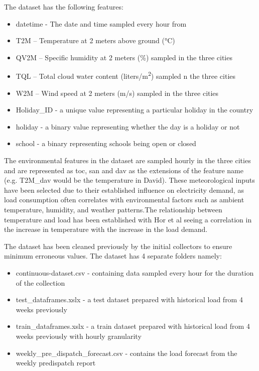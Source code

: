 The dataset has the following features:
\begin{itemize}
	\item datetime - The date and time sampled every hour from 
	\item T2M – Temperature at 2 meters above ground (°C)
	\item QV2M – Specific humidity at 2 meters (\%) sampled in the three cities
	\item TQL – Total cloud water content (liters/\si{m^2}) sampled n the three cities
	\item W2M – Wind speed at 2 meters (m/s) sampled in the three cities
	\item Holiday\_ID - a unique value representing a particular holiday in the country
	\item holiday - a binary value representing whether the day is a holiday or not
	\item school - a binary representing schools being open or closed \cite{dataset}
	
\end{itemize}


The environmental features in the dataset are sampled hourly in the three cities and are represented as toc, san and dav as the extensions of the feature name (e.g. T2M\_dav would be the temperature in David). These meteorological inputs have been selected due to their established influence on electricity demand, as load consumption often correlates with environmental factors such as ambient temperature, humidity, and weather patterns.The relationship between temperature and load has been established with Hor et al \cite{hor2005analyzing} seeing a correlation in the increase in temperature with the increase in the load demand.

The dataset has been cleaned previously by the  initial collectors to ensure minimum erroneous values. The dataset has 4 separate folders namely:
\begin{itemize}
	\item continuous-dataset.csv - containing data sampled every hour for the duration of the collection
	\item test\_dataframes.xslx - a test dataset prepared with historical load from 4 weeks previously \cite{dataset}
	\item train\_dataframes.xslx - a train dataset prepared with historical load from 4 weeks previously with hourly granularity \cite{dataset}
	\item weekly\_pre\_dispatch\_forecast.csv - contains the load forecast from the weekly predispatch report
\end{itemize}

